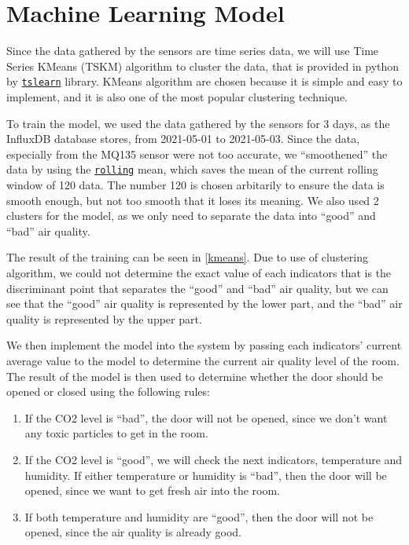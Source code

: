 \section{Machine Learning Model}

Since the data gathered by the sensors are time
series data, we will use Time Series KMeans (TSKM)
algorithm to cluster the data, that is provided in
python by
\href{https://tslearn.readthedocs.io/en/stable/}{\texttt{tslearn}} library.
KMeans algorithm are chosen because it is simple and
easy to implement, and it is also one of the most
popular clustering technique.

To train the model, we used the data gathered by the
sensors for 3 days, as the InfluxDB database stores,
from 2021-05-01 to 2021-05-03. Since the data,
especially from the MQ135 sensor were not too
accurate, we ``smoothened'' the data by using the
\href{https://pandas.pydata.org/docs/reference/api/pandas.DataFrame.rolling.html}{\texttt{rolling}} mean, which saves
the mean of the current rolling window of 120 data. The number
120 is chosen arbitarily to ensure the data is smooth enough,
but not too smooth that it loses its meaning. We also used 2
clusters for the model, as we only need to separate the data
into ``good'' and ``bad'' air quality.

The result of the training can be seen in
\ref{kmeans}. Due to use of clustering algorithm, we could not
determine the exact value of each indicators that is the
discriminant point that separates the ``good'' and ``bad''
air quality, but we can see that the ``good'' air quality is
represented by the lower part, and the ``bad'' air quality is
represented by the upper part.

We then implement the model into the system by passing each
indicators' current average value to the model to determine
the current air quality level of the room. The result of the
model is then used to determine whether the door should be
opened or closed using the following rules:
\begin{enumerate}
      \item If the CO2 level is ``bad'', the door will not be
            opened, since we don't want any toxic particles to
            get in the room.
      \item If the CO2 level is ``good'', we will check the
            next indicators, temperature and humidity. If
            either temperature or humidity is ``bad'', then the
            door will be opened, since we want to get fresh
            air into the room.
      \item If both temperature and humidity are ``good'',
            then the door will not be opened, since the air
            quality is already good.
\end{enumerate}


